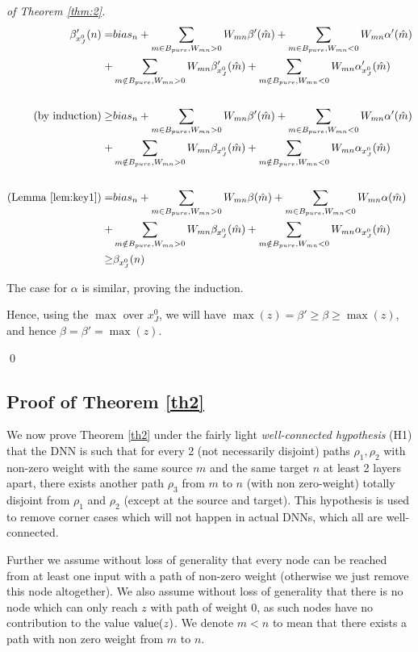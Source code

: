 \begin{proof}[of Theorem \ref{thm:2}]
\begin{align*}
\beta'_{x_J^0}(n) = & {bias}_n+\sum_{m\in B_{pure},W_{mn}>0} W_{mn} \beta'(\hat{m})+\sum_{m\in B_{pure},W_{mn}<0} W_{mn} \alpha'(\hat{m})\\
+&\sum_{m\notin B_{pure},W_{mn}>0} W_{mn} \beta'_{x_J^0}(\hat{m})+\sum_{m\notin B_{pure},W_{mn}<0} W_{mn} \alpha'_{x_J^0}(\hat{m})\\
\\
(\text{by induction})\geq & {bias}_n+\sum_{m\in B_{pure},W_{mn}>0} W_{mn} \beta'(\hat{m})+\sum_{m\in B_{pure},W_{mn}<0} W_{mn} \alpha'(\hat{m})\\
+&\sum_{m\notin B_{pure},W_{mn}>0} W_{mn} \beta_{x_J^0}(\hat{m})+\sum_{m\notin B_{pure},W_{mn}<0} W_{mn} \alpha_{x_J^0}(\hat{m})\\
\\
(\text{Lemma \ref{lem:key1}})= & {bias}_n+\sum_{m\in B_{pure},W_{mn}>0} W_{mn} \beta(\hat{m})+\sum_{m\in B_{pure},W_{mn}<0} W_{mn} \alpha(\hat{m})\\
+&\sum_{m\notin B_{pure},W_{mn}>0} W_{mn} \beta_{x_J^0}(\hat{m})+\sum_{m\notin B_{pure},W_{mn}<0} W_{mn} \alpha_{x_J^0}(\hat{m})\\
\geq & \beta_{x_J^0}(n)
\end{align*} 

The case for $\alpha$ is similar, proving the induction.

Hence, using the $\max$ over ${x_J^0}$, 
we will have $\max(z) = \beta'\geq \beta \geq \max(z)$, and hence $\beta=\beta'=\max(z)$.

\qed
	
\end{proof}


\subsection{Proof of Theorem \ref{th2}}


We now prove Theorem \ref{th2} under the fairly light {\em well-connected hypothesis} (H1) that the DNN is such that for every 2 (not necessarily disjoint) paths $\rho_1,\rho_2$ with non-zero weight with the same source $m$ and the same target $n$ at least 2 layers apart, there exists another path $\rho_3$ from $m$ to $n$ (with non zero-weight) totally disjoint from $\rho_1$ and $\rho_2$ (except at the source and target). This hypothesis is used to remove corner cases which will not happen in actual DNNs, which all are well-connected.

Further we assume without loss of generality that every node can be reached from at least one input with a path of non-zero weight (otherwise we just remove this node altogether).
We also assume without loss of generality that there is no node which can only reach $z$ with path of weight $0$, as such nodes have no contribution to the value ${\textrm{value}}(z)$. We denote $m<n$ to mean that there exists a path with non zero weight from $m$ to $n$.

